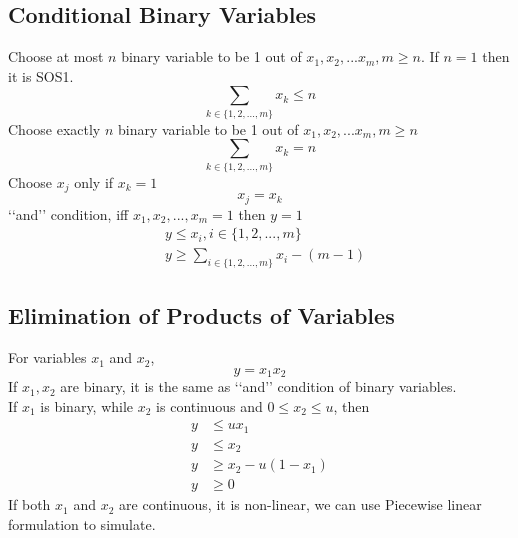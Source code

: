 \documentclass[10pt]{book}
\begin{document}
				\subsection{Conditional Binary Variables}
					 Choose at most $n$ binary variable to be 1 out of  $x_1, x_2, ... x_m, m\ge n$. If $n=1$ then it is SOS1.\\
					\begin{equation}
						\sum_{k\in \{1,2,...,m\}} x_k \le n\nonumber
					\end{equation}
					 Choose exactly $n$ binary variable to be 1 out of  $x_1, x_2, ... x_m, m\ge n$\\
					\begin{equation}
						\sum_{k\in \{1,2,...,m\}} x_k = n\nonumber
					\end{equation}
					 Choose $x_j$ only if $x_k = 1$\\
					\begin{equation}x_j = x_k \nonumber \end{equation}
					 \lq\lq{}and\rq\rq{} condition, iff $x_1, x_2, ... , x_m =1$ then $y=1$\\
					\begin{align}
						& y \le x_i, i\in \{1, 2, ..., m\} \nonumber \\
						& y \ge \sum_{i \in \{1, 2, ..., m\}} x_i - (m - 1) \nonumber
					\end{align}

				\subsection{Elimination of Products of Variables}
					 For variables $x_1$ and $x_2$,
					\begin{equation}y = x_1 x_2\nonumber\end{equation}
					 If $x_1, x_2$ are binary, it is the same as \lq\lq{}and\rq\rq{} condition of binary variables.\\
					If $x_1$ is binary, while $x_2$ is continuous and $0 \le x_2 \le u$, then
					\begin{align}
						y &\le ux_1 \nonumber \\
						y &\le x_2 \nonumber \\
						y &\ge x_2 - u(1- x_1) \nonumber \\
						y &\ge 0 \nonumber
					\end{align}
					If both $x_1$ and $x_2$ are continuous, it is non-linear, we can use Piecewise linear formulation to simulate.
\end{document}
